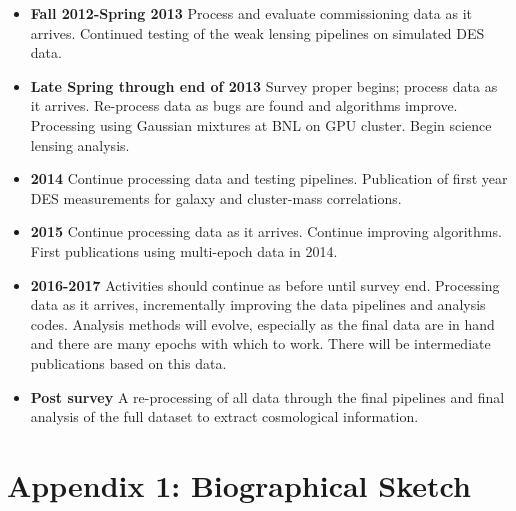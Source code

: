 \documentclass[12pt]{article}
\begin{document}
\begin{itemize}

\item {\bf Fall 2012-Spring 2013} Process and evaluate commissioning data as it
arrives.  Continued testing of the weak lensing pipelines on simulated
DES data.

\item {\bf Late Spring through end of 2013} Survey proper begins; process data
as it arrives.  Re-process data as bugs are found and algorithms improve.
Processing using Gaussian mixtures at BNL on GPU cluster.  Begin science
lensing analysis.

\item {\bf 2014} Continue processing data and testing pipelines.  Publication
of first year DES measurements for galaxy and cluster-mass correlations.

\item {\bf 2015} Continue processing data as it arrives.  Continue
improving algorithms.   First publications using multi-epoch data
in 2014.

\item {\bf 2016-2017}  Activities should continue as before until survey end.
Processing data as it arrives, incrementally improving the data pipelines and
analysis codes.  Analysis methods will evolve, especially as the final data are
in hand and there are many epochs with which to work.   There will be
intermediate publications based on this data.

\item {\bf Post survey} A re-processing of all data through the final pipelines
and final analysis of the full dataset to extract cosmological information.


\end{itemize}







\newpage
{}
\section*{Appendix 1: Biographical Sketch}


\newcommand{\tsp}{\vspace{0.1cm}}
\newcommand{\isp}{\vspace{0.3cm}}
\newcommand{\ssp}{\vspace{0.4cm}}
\end{document}
